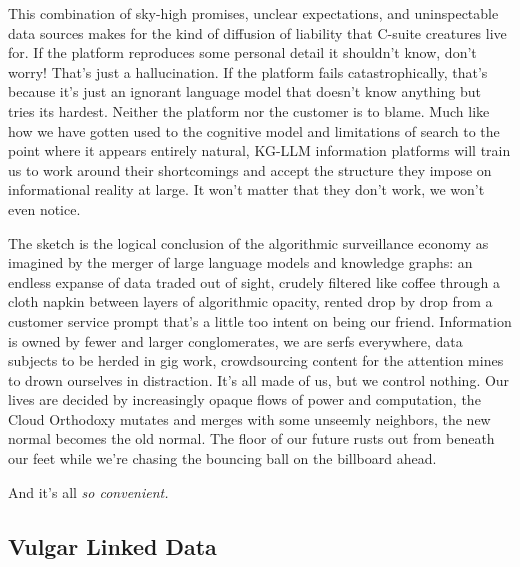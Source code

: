 \documentclass{article}
\begin{document}
This combination of sky-high promises, unclear expectations, and
uninspectable data sources makes for the kind of diffusion of liability
that C-suite creatures live for. If the platform reproduces some
personal detail it shouldn't know, don't worry! That's just a
hallucination. If the platform fails catastrophically, that's because
it's just an ignorant language model that doesn't know anything but
tries its hardest. Neither the platform nor the
customer is to blame. Much like how we have gotten used to the cognitive
model and limitations of search to the point where it appears entirely
natural, KG-LLM information platforms will train us to work around their
shortcomings and accept the structure they impose on informational
reality at large. It won't matter that they don't work, we won't even
notice.

The sketch is the logical conclusion of the algorithmic surveillance
economy as imagined by the merger of large language models and knowledge
graphs: an endless expanse of data traded out of sight, crudely filtered
like coffee through a cloth napkin between layers of algorithmic
opacity, rented drop by drop from a customer service prompt that's a
little too intent on being our friend. Information is owned by fewer and
larger conglomerates, we are serfs everywhere, data subjects to be
herded in gig work, crowdsourcing content for the attention mines to
drown ourselves in distraction. It's all made of us, but we control
nothing. Our lives are decided by increasingly opaque flows of power and
computation, the Cloud Orthodoxy mutates and merges with some unseemly
neighbors, the new normal becomes the old normal. The floor of our
future rusts out from beneath our feet while we're chasing the bouncing
ball on the billboard ahead.

And it's all \emph{so convenient.}

\hypertarget{vulgar-linked-data}{%
\subsection{Vulgar Linked Data}\label{vulgar-linked-data}}
\end{document}
